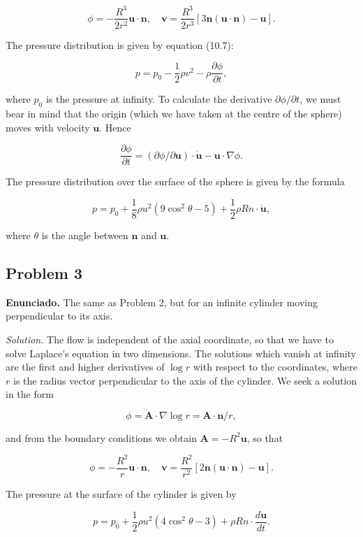 \documentclass{article}
\begin{document}
$$
\phi = -\frac{R^3}{2r^2} \mathbf{u} \cdot \mathbf{n}, \quad \mathbf{v} = \frac{R^3}{2r^3} [3\mathbf{n}(\mathbf{u} \cdot \mathbf{n}) - \mathbf{u}].
$$

The pressure distribution is given by equation (10.7):

$$
p = p_0 - \frac{1}{2} \rho v^2 - \rho \frac{\partial \phi}{\partial t},
$$

where $p_0$ is the pressure at infinity. To calculate the derivative $\partial \phi/\partial t$, we must bear in mind that the origin (which we have taken at the centre of the sphere) moves with velocity $\mathbf{u}$. Hence

$$
\frac{\partial \phi}{\partial t} = (\partial \phi/\partial \mathbf{u}) \cdot \dot{\mathbf{u}} - \mathbf{u} \cdot \nabla \phi.
$$

The pressure distribution over the surface of the sphere is given by the formula

$$
p = p_0 + \frac{1}{8} \rho u^2 (9 \cos^2 \theta - 5) + \frac{1}{2} \rho R n \cdot \dot{\mathbf{u}},
$$

where $\theta$ is the angle between $\mathbf{n}$ and $\mathbf{u}$.

\subsection*{Problem 3}

\textbf{Enunciado.} The same as Problem 2, but for an infinite cylinder moving perpendicular to its axis.

\textit{Solution.} The flow is independent of the axial coordinate, so that we have to solve Laplace's equation in two dimensions. The solutions which vanish at infinity are the first and higher derivatives of $\log r$ with respect to the coordinates, where $r$ is the radius vector perpendicular to the axis of the cylinder. We seek a solution in the form

$$
\phi = \mathbf{A} \cdot \nabla \log r = \mathbf{A} \cdot \mathbf{n}/r,
$$

and from the boundary conditions we obtain $\mathbf{A} = -R^2 \mathbf{u}$, so that

$$
\phi = -\frac{R^2}{r} \mathbf{u} \cdot \mathbf{n}, \quad \mathbf{v} = \frac{R^2}{r^2} [2\mathbf{n}(\mathbf{u} \cdot \mathbf{n}) - \mathbf{u}].
$$

The pressure at the surface of the cylinder is given by

$$
p = p_0 + \frac{1}{2} \rho u^2 (4 \cos^2 \theta - 3) + \rho R n \cdot \frac{d\mathbf{u}}{dt}.
$$
\end{document}
